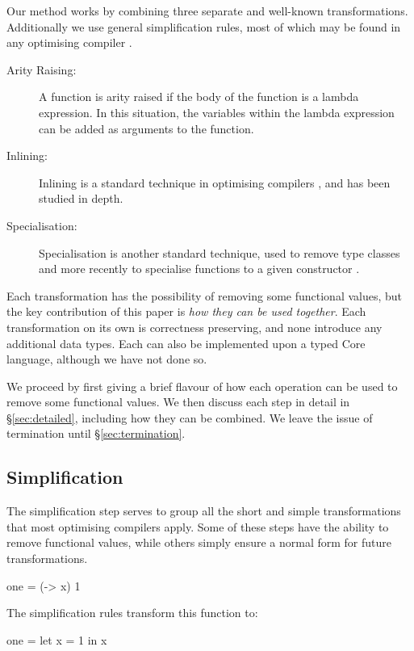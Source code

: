 \documentclass[preprint]{sigplanconf}
\begin{document}
Our method works by combining three separate and well-known transformations. Additionally we use general simplification rules, most of which may be found in any optimising compiler \cite{spj:transformation}.

\begin{description}
\item[Arity Raising:] A function is arity raised if the body of the function is a lambda expression. In this situation, the variables within the lambda expression can be added as arguments to the function.
\item[Inlining:] Inlining is a standard technique in optimising compilers \cite{spj:inlining}, and has been studied in depth.
\item[Specialisation:] Specialisation is another standard technique, used to remove type classes \cite{jones:dictionary_free} and more recently to specialise functions to a given constructor \cite{spj:specconstr}.
\end{description}

Each transformation has the possibility of removing some functional values, but the key contribution of this paper is \textit{how they can be used together}. Each transformation on its own is correctness preserving, and none introduce any additional data types. Each can also be implemented upon a typed Core language, although we have not done so.

We proceed by first giving a brief flavour of how each operation can be used to remove some functional values. We then discuss each step in detail in \S\ref{sec:detailed}, including how they can be combined. We leave the issue of termination until \S\ref{sec:termination}.

\subsection{Simplification}

The simplification step serves to group all the short and simple transformations that most optimising compilers apply. Some of these steps have the ability to remove functional values, while others simply ensure a normal form for future transformations.

\begin{example}
\begin{code}
one = (\x -> x) 1
\end{code}

The simplification rules transform this function to:

\begin{code}
one = let x = 1 in x
\end{code}
\end{example}
\end{document}
